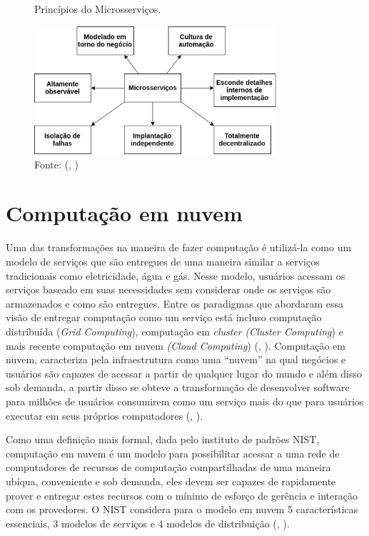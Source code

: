 \documentclass[]{politex}
\begin{document}
\begin{figure}[H]
    \centering
    \caption{Princípios do Microsserviços.}
    \includegraphics[width=0.8\textwidth]{microservices}
    \caption*{Fonte: (, \citeyear{Newman})}
    \label{fig:newman}
\end{figure}

\section{Computação em nuvem}
Uma das transformações na maneira de fazer computação é utilizá-la como um modelo de serviços que são entregues de uma maneira similar a serviços tradicionais como eletricidade, água e gás. Nesse modelo, usuários acessam os serviços baseado em suas necessidades sem considerar onde os serviços são armazenados e como são entregues. Entre os paradigmas que abordaram essa visão de entregar computação como um serviço está incluso computação distribuída (\textit{Grid Computing}), computação em \textit{cluster} \textit{(Cluster Computing}) e mais recente computação em nuvem \textit{(Cloud Computing}) (, \citeyear{Buyya}).
Computação em nuvem, caracteriza pela infraestrutura como uma “nuvem” na qual negócios e usuários são capazes de acessar a partir de qualquer lugar do mundo e além disso sob demanda, a partir disso se obteve a transformação de desenvolver software para milhões de usuários consumirem como um serviço mais do que para usuários executar em seus próprios computadores (, \citeyear{Buyya}).

Como uma definição mais formal, dada pelo instituto de padrões NIST,  computação em nuvem é um modelo para possibilitar acessar a uma rede de computadores de recursos de computação compartilhadas de uma maneira ubíqua, conveniente e sob demanda, eles devem ser capazes de rapidamente prover e entregar estes recursos com o mínimo de esforço de gerência e interação com os provedores. O NIST considera para o modelo em nuvem 5 características essenciais,  3 modelos de serviços e 4 modelos de distribuição (, \citeyear{nist}).
\end{document}
